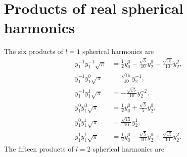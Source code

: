 \documentclass[11pt]{article}
\begin{document}
\section{Products of real spherical harmonics}\label{realspherical}
The six products of $l=1$ spherical harmonics are
\begin{align}
y_1^{-1}y_1^{-1}\sqrt{\pi} &= \frac{1}{2 }y_0^0 - \frac{\sqrt{5}}{10 }y_2^0 - \frac{\sqrt{15}}{10 }y_2^2,\\ 
y_1^{-1}y_1^0\sqrt{\pi} &= \frac{\sqrt{15}}{10 }y_2^{-1} ,\\
y_1^{-1}y_1^1\sqrt{\pi} &= - \frac{\sqrt{15}}{10 }y_2^{-2} ,\\
y_1^0y_1^0\sqrt{\pi} &= \frac{1}{2 }y_0^0 + \frac{\sqrt{5}}{5 }y_2^0 ,\\
y_1^0y_1^1\sqrt{\pi} &= \frac{\sqrt{15}}{10 }y_2^1 ,\\
y_1^1y_1^1\sqrt{\pi} &= \frac{1}{2 }y_0^0 - \frac{\sqrt{5}}{10 }y_2^0 + \frac{\sqrt{15}}{10 }y_2^2.
\end{align}
The fifteen products of $l=2$ spherical harmonics are
\end{document}
